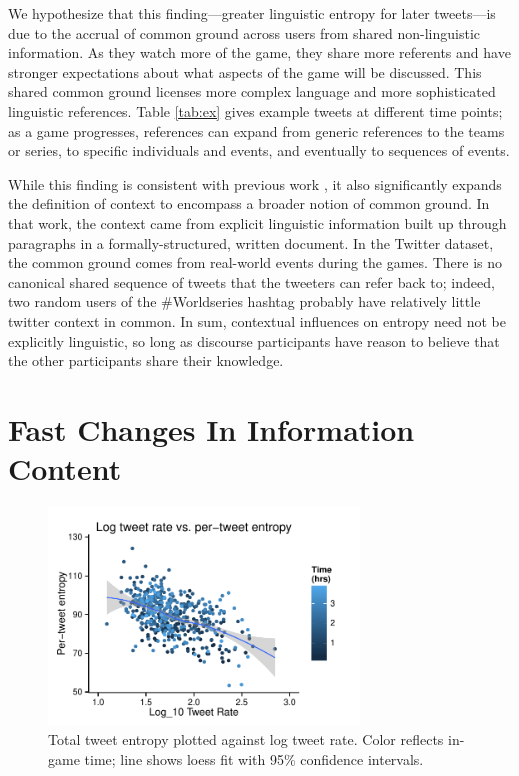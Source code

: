 \documentclass[11pt,letterpaper]{article}
\begin{document}
We hypothesize that this finding---greater linguistic entropy for later tweets---is due to the accrual of common ground across users from shared non-linguistic information. As they watch more of the game, they share more referents and have stronger expectations about what aspects of the game will be discussed. This shared common ground licenses more complex language and more sophisticated linguistic references. Table \ref{tab:ex} gives example tweets at different time points; as a game progresses, references can expand from generic references to the teams or series, to specific individuals and events, and eventually to sequences of events.

While this finding is consistent with previous work \cite{genzel2002,qian2012}, it also significantly expands the definition of context to encompass a broader notion of common ground.  In that work, the context came from explicit linguistic information built up through paragraphs in a formally-structured, written document.  In the Twitter dataset, the common ground comes from real-world events during the games. There is no canonical shared sequence of tweets that the tweeters can refer back to; indeed, two random users of the \#Worldseries hashtag probably have relatively little twitter context in common.  In sum, contextual influences on entropy need not be explicitly linguistic, so long as discourse participants have reason to believe that the other participants share their knowledge.

\section{Fast Changes In Information Content}

\begin{figure}
 \centering
  \includegraphics[width=3.25in]{figures/fig2.pdf}
 \caption{Total tweet entropy plotted against log tweet rate. Color reflects in-game time; line shows loess fit with 95\% confidence intervals.}\label{fig:lrate-tent}\vspace*{-.5em}
\end{figure}
\end{document}
